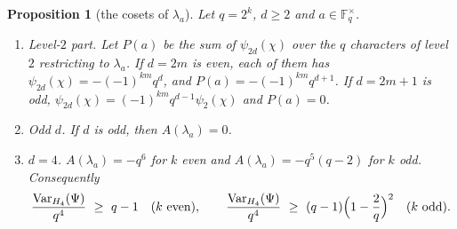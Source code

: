 \documentclass[11pt,a4paper]{amsart}
\newtheorem{proposition}[theorem]{Proposition}
\theoremstyle{definition}
\theoremstyle{remark}
\newcommand{\F}{\mathbb{F}}
\newcommand{\Var}{\operatorname{Var}}
\begin{document}
\begin{proposition}[the cosets of $\lambda_a$]\label{prop:lambda_a}
Let $q=2^k$, $d\ge2$ and $a\in\F_q^\times$.
\begin{enumerate}
\item \emph{Level-$2$ part.} Let $P(a)$ be the sum of $\psi_{2d}(\chi)$ over the $q$ characters of level $2$
restricting to $\lambda_a$. If $d=2m$ is even, each of them has $\psi_{2d}(\chi)=-(-1)^{km}q^d$, and
$P(a)=-(-1)^{km}q^{d+1}$. If $d=2m+1$ is odd, $\psi_{2d}(\chi)=(-1)^{km}q^{d-1}\psi_2(\chi)$ and $P(a)=0$.
\item \emph{Odd $d$.} If $d$ is odd, then $A(\lambda_a)=0$.
\item \emph{$d=4$.} $A(\lambda_a)=-q^6$ for $k$ even and $A(\lambda_a)=-q^5(q-2)$ for $k$ odd. Consequently
\[
\frac{\Var_{H_4}(\Psi)}{q^4}\ \ge\ q-1\quad(k\text{ even}),\qquad \frac{\Var_{H_4}(\Psi)}{q^4}\ \ge\ (q-1)\Bigl(1-\frac2q\Bigr)^2\quad(k\text{ odd}).
\]
\end{enumerate}
\end{proposition}
\end{document}
